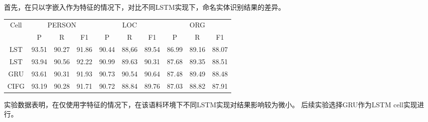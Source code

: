首先，在只以字嵌入作为特征的情况下，对比不同LSTM实现下，命名实体识别结果的差异。
\begin{table}[H]
    \centering
    \begin{tabular}{cccccccccc}
        \toprule
            \multirow{2}{*}{Cell} &\multicolumn{3}{c}{PERSON} &\multicolumn{3}{c}{LOC} &\multicolumn{3}{c}{ORG}\\
            \cmidrule(lr){2-4} \cmidrule(lr){5-7} \cmidrule(lr){8-10}
            & P & R & F1 & P & R & F1 & P & R & F1\\
        \midrule
        $\mathop{LSTM_{baseline}}$ & 93.51 & 90.27 & 91.86 & 90.44 & 88,66 & 89.54 & 86.99 & 89.16 & 88.07\\
        $\mathop{LSTM_{peep-hole}}$ & 93.94 & 90.56 & 92.22 & 90.99 & 89.63 & 90.31 & 87.68 & 89.35 & 88.51\\
        GRU & 93.61 & 90.31 & 91.93 & 90.73 & 90.54 & 90.64 & 87.48 & 89.49 & 88.48\\
        CIFG  & 93.19 & 90.28 & 91.71 & 90.72 & 88.84 & 89.76 & 87.03 & 88.82 & 87.91\\
        \bottomrule
    \end{tabular}
    \label{tab:lstm_cell_comparison}
\end{table}

实验数据表明，在仅使用字特征的情况下，在该语料环境下不同LSTM实现对结果影响较为微小。
后续实验选择GRU作为LSTM cell实现进行。


